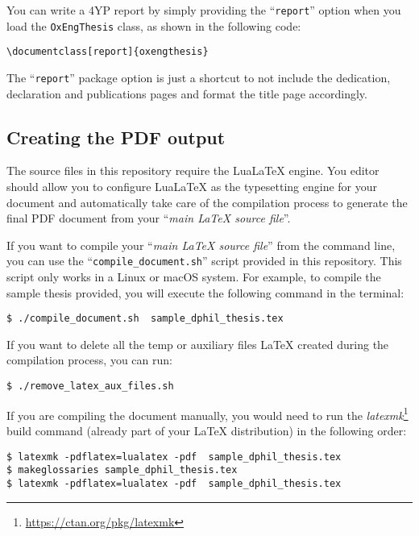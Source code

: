 You can write a 4YP report by simply providing the ``\verb|report|'' option when you load the \verb|OxEngThesis| class, as shown in the following code:


\begin{lstlisting}[style=custom-latex]
\documentclass[report]{oxengthesis}
\end{lstlisting}

The ``\verb|report|'' package option is just a shortcut to not include the dedication, declaration and publications pages and format the title page accordingly.


\subsection{Creating the PDF output}


The source files in this repository require the LuaLaTeX engine. You editor should allow you to configure LuaLaTeX as the typesetting engine for your document and automatically take care of the compilation process to generate the final PDF document from your ``\textit{main LaTeX source file}''.

If you want to compile your ``\textit{main LaTeX source file}'' from the command line, you can use the ``\verb|compile_document.sh|'' script provided in this repository. This script only works in a Linux or macOS system. For example, to compile the sample thesis provided, you will execute the following command in the terminal:


\begin{lstlisting}[style=custom-bash]
$ ./compile_document.sh  sample_dphil_thesis.tex
\end{lstlisting}

If you want to delete all the temp or auxiliary files LaTeX created during the compilation process, you can run:

\begin{lstlisting}[style=custom-bash]
$ ./remove_latex_aux_files.sh
\end{lstlisting}


If you are compiling the document manually, you would need to run the \textit{latexmk}\footnote{\url{https://ctan.org/pkg/latexmk}} build command (already part of your LaTeX distribution) in the following order:

\begin{lstlisting}[style=custom-bash]
$ latexmk -pdflatex=lualatex -pdf  sample_dphil_thesis.tex
$ makeglossaries sample_dphil_thesis.tex
$ latexmk -pdflatex=lualatex -pdf  sample_dphil_thesis.tex
\end{lstlisting}


